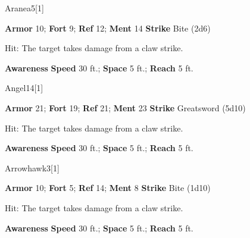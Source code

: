 \begin{monsection}{Aranea}{5}[1]
\begin{spellcontent}
\begin{spelltargetinginfo}
\pari \textbf{Armor} 10; \textbf{Fort} 9; \textbf{Ref} 12; \textbf{Ment} 14
\pari \textbf{Strike} Bite  (2d6)
\end{spelltargetinginfo}
\begin{spelleffects}
\pari {}
\par Hit: The target takes damage from a claw strike.
\end{spelleffects}
\end{spellcontent}
\begin{spellfooter}
\pari \textbf{Awareness} 
\pari \textbf{Speed} 30 ft.; \textbf{Space} 5 ft.; \textbf{Reach} 5 ft.
\end{spellfooter}
\end{monsection}
\begin{monsection}{Angel}{14}[1]
\begin{spellcontent}
\begin{spelltargetinginfo}
\pari \textbf{Armor} 21; \textbf{Fort} 19; \textbf{Ref} 21; \textbf{Ment} 23
\pari \textbf{Strike} Greatsword  (5d10)
\end{spelltargetinginfo}
\begin{spelleffects}
\pari {}
\par Hit: The target takes damage from a claw strike.
\end{spelleffects}
\end{spellcontent}
\begin{spellfooter}
\pari \textbf{Awareness} 
\pari \textbf{Speed} 30 ft.; \textbf{Space} 5 ft.; \textbf{Reach} 5 ft.
\end{spellfooter}
\end{monsection}
\begin{monsection}{Arrowhawk}{3}[1]
\begin{spellcontent}
\begin{spelltargetinginfo}
\pari \textbf{Armor} 10; \textbf{Fort} 5; \textbf{Ref} 14; \textbf{Ment} 8
\pari \textbf{Strike} Bite  (1d10)
\end{spelltargetinginfo}
\begin{spelleffects}
\pari {}
\par Hit: The target takes damage from a claw strike.
\end{spelleffects}
\end{spellcontent}
\begin{spellfooter}
\pari \textbf{Awareness} 
\pari \textbf{Speed} 30 ft.; \textbf{Space} 5 ft.; \textbf{Reach} 5 ft.
\end{spellfooter}
\end{monsection}
